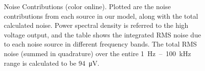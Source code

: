 \documentclass[aip,rsi,reprint]{revtex4-1} %
\begin{document}
\begin{figure}[t]

\caption{Noise Contributions (color online). Plotted are the noise contributions from each source in our model, along with the total calculated noise. Power spectral density is referred to the high voltage output, and the table shows the integrated RMS noise due to each noise source in different frequency bands. The total RMS noise (summed in quadrature) over the entire \SI{1}{\hertz}~--~\SI{100}{\kilo\hertz} range is calculated to be \SI{94}{\micro\volt}. \label{Fig:NoisePlot}}
\end{figure}
\end{document}
